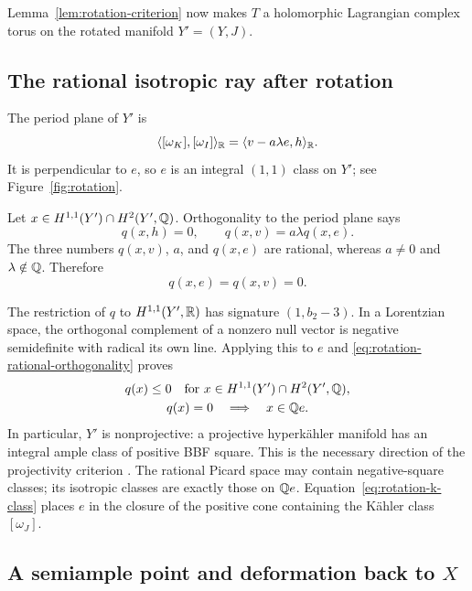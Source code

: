 Lemma~\ref{lem:rotation-criterion} now makes $T$ a holomorphic
Lagrangian complex torus on the rotated manifold $Y'=(Y,J)$.

\subsection{The rational isotropic ray after rotation}

The period plane of $Y'$ is
\begin{equation}
       \langle[\omega_K],[\omega_I]\rangle_{\mathbb R}
       =\langle v-a\lambda e,h\rangle_{\mathbb R}.
\label{eq:rotation-j-period}
\end{equation}
It is perpendicular to $e$, so $e$ is an integral $(1,1)$ class
on $Y'$; see Figure~\ref{fig:rotation}.



Let
$x\in H^{1,1}(Y')\cap H^2(Y',\mathbb Q)$.  Orthogonality to the period
plane says
\[
                q(x,h)=0,\qquad q(x,v)=a\lambda q(x,e).
\]
The three numbers $q(x,v)$, $a$, and $q(x,e)$ are rational,
whereas $a\ne0$ and $\lambda\notin\mathbb Q$.  Therefore
\begin{equation}
             q(x,e)=q(x,v)=0.
\label{eq:rotation-rational-orthogonality}
\end{equation}

The restriction of $q$ to $H^{1,1}(Y',\mathbb R)$ has signature
$(1,b_2-3)$.  In a Lorentzian space, the orthogonal complement of
a nonzero null vector is negative semidefinite with radical its
own line.  Applying this to $e$ and
\eqref{eq:rotation-rational-orthogonality} proves
\begin{equation}
 \begin{gathered}
 q(x)\le0\quad\text{for }x\in H^{1,1}(Y')\cap H^2(Y',\mathbb Q),\\
 q(x)=0\quad\Longrightarrow\quad x\in\mathbb Q e.
 \end{gathered}
\label{eq:rotation-unique-ray}
\end{equation}
In particular, $Y'$ is nonprojective: a projective hyperk\"ahler
manifold has an integral ample class of positive BBF square.
This is the necessary direction of the projectivity criterion
\cite{Huybrechts,HuybrechtsErratum}.  The rational Picard space
may contain negative-square classes; its isotropic classes are
exactly those on $\mathbb Q e$.  Equation~\eqref{eq:rotation-k-class}
places $e$ in the closure of the positive cone containing the
K\"ahler class $[\omega_J]$.

\subsection{A semiample point and deformation back to \texorpdfstring{$X$}{X}}

